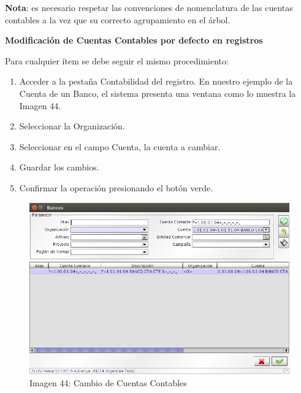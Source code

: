 \documentclass[letterpaper,10pt,spanish]{sphinxmanual}
\begin{document}
\textbf{Nota}: es necesario respetar las convenciones de nomenclatura de las cuentas contables a la vez que su correcto agrupamiento en el árbol.

\textbf{Modificación de Cuentas Contables por defecto en registros}

Para cualquier ítem se debe seguir el mismo procedimiento:
\begin{enumerate}
\item {} 
Acceder a la pestaña Contabilidad del registro. En nuestro ejemplo de la Cuenta de un Banco, el sistema presenta una ventana como lo muestra la Imagen 44.

\item {} 
Seleccionar la Organización.

\item {} 
Seleccionar en el campo Cuenta, la cuenta a cambiar.

\item {} 
Guardar los cambios.

\item {} 
Confirmar la operación presionando el botón verde.

\end{enumerate}
\begin{figure}[htbp]
\centering
\capstart

\includegraphics{ly_contabilidad_44.png}
\caption{Imagen 44: Cambio de Cuentas Contables}\end{figure}
\end{document}
